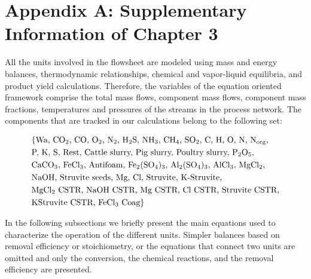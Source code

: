 \chapter{Appendix A: Supplementary Information of Chapter 3}
\begin{refsection}[referencesCh2]
All the units involved in the flowsheet are modeled using mass and energy balances, thermodynamic relationships, chemical and vapor-liquid equilibria, and product yield calculations. Therefore, the variables of the equation oriented framework comprise the total mass flows, component mass flows, component mass fractions, temperatures and pressures of the streams in the process network. The components that are tracked in our calculations belong to the following set:

\begin{align*}
	& \{\text{Wa, CO\textsubscript{2}, CO, O\textsubscript{2}, N\textsubscript{2}, H\textsubscript{2}S, NH\textsubscript{3}, CH\textsubscript{4}, SO\textsubscript{2}, C, H, O, N, N\textsubscript{org},} \\
	& \text{P, K, S, Rest, Cattle slurry, Pig slurry, Poultry slurry, P\textsubscript{2}O\textsubscript{5},} \\
	& \text{CaCO\textsubscript{3}, FeCl\textsubscript{3}, Antifoam,  Fe\textsubscript{2}(SO\textsubscript{4})\textsubscript{3}, Al\textsubscript{2}(SO\textsubscript{4})\textsubscript{3}, AlCl\textsubscript{3}, MgCl\textsubscript{2},} \\
	& \text{NaOH, Struvite seeds, Mg, Cl, Struvite, K-Struvite,} \\
	& \text{MgCl\textsubscript{2} CSTR, NaOH CSTR, Mg CSTR, Cl CSTR, Struvite CSTR,}\\
	&  \text{KStruvite CSTR, FeCl\textsubscript{3} Coag}
	\}
\end{align*}

In the following subsections we briefly present the main equations used to characterize the operation of the different units. Simpler balances based on removal efficiency or stoichiometry, or the equations that connect two units are omitted and only the conversion, the chemical reactions, and the removal efficiency are presented.


\end{refsection}
